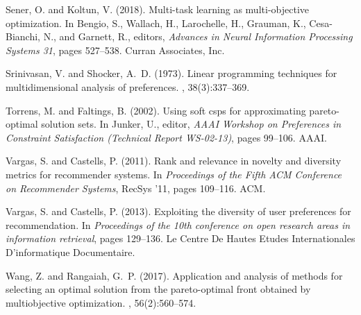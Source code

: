 \documentclass[letterpaper]{article}
\begin{document}
\begin{thebibliography}{}
Sener, O. and Koltun, V. (2018).
\newblock Multi-task learning as multi-objective optimization.
\newblock In Bengio, S., Wallach, H., Larochelle, H., Grauman, K.,
  Cesa-Bianchi, N., and Garnett, R., editors, {\em Advances in Neural
  Information Processing Systems 31}, pages 527--538. Curran Associates, Inc.

Srinivasan, V. and Shocker, A.~D. (1973).
\newblock Linear programming techniques for multidimensional analysis of
  preferences.
, 38(3):337--369.

Torrens, M. and Faltings, B. (2002).
\newblock Using soft csps for approximating pareto-optimal solution sets.
\newblock In Junker, U., editor, {\em AAAI Workshop on Preferences in
  Constraint Satisfaction (Technical Report WS-02-13)}, pages 99--106. AAAI.

Vargas, S. and Castells, P. (2011).
\newblock Rank and relevance in novelty and diversity metrics for recommender
  systems.
\newblock In {\em Proceedings of the Fifth ACM Conference on Recommender
  Systems}, RecSys '11, pages 109--116. ACM.

Vargas, S. and Castells, P. (2013).
\newblock Exploiting the diversity of user preferences for recommendation.
\newblock In {\em Proceedings of the 10th conference on open research areas in
  information retrieval}, pages 129--136. Le Centre De Hautes Etudes
  Internationales D'informatique Documentaire.

Wang, Z. and Rangaiah, G.~P. (2017).
\newblock Application and analysis of methods for selecting an optimal solution
  from the pareto-optimal front obtained by multiobjective optimization.
, 56(2):560--574.

\end{thebibliography}
\end{document}
